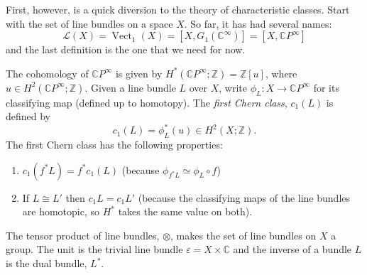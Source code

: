\documentclass[a4paper,10pt]{article}
\theoremstyle{plain}%
\theoremstyle{definition}
\theoremstyle{remark}
\newcommand{\ZZ}{\mathbb{Z}}
\newcommand{\CC}{\mathbb{C}}
\newcommand{\cp}{\CC P}   %
\newcommand{\CPi}{\cp^\infty}
\DeclareMathOperator{\Vect}{Vect}
\renewcommand{\epsilon}{\varepsilon}
\begin{document}
First, however, is a quick diversion to the theory of characteristic
classes. Start with the set of line bundles on a space $X$. So far, it
has had several names:
\begin{equation*}
  \mathcal{L}(X) = \Vect_1(X) = [X, G_1(\CC^\infty)] = [X, \CPi]
\end{equation*}
and the last definition is the one that we need for now.

The cohomology of $\CPi$ is given by $H^*(\CPi; \ZZ) = \ZZ[u]$, where
$u\in H^2(\CPi;\ZZ)$. Given a line bundle $L$ over $X$, write $\phi_L:
X\to \CPi$ for its classifying map (defined up to homotopy). The
\emph{first Chern class}, $c_1(L)$ is defined by
\begin{equation}\label{eq:first-chern-class}
  c_1(L) = \phi_L^*(u) \in H^2(X; \ZZ).
\end{equation}
The first Chern class has the following properties:
\begin{enumerate}
\item $c_1(f^*L) = f^*c_1(L)$ (because $\phi_{f^*L} \simeq \phi_L
  \circ f$)

\item If $L \cong L'$ then $c_1L = c_1L'$ (because the classifying
  maps of the line bundles are homotopic, so $H^*$ takes the same
  value on both).
\end{enumerate}
The tensor product of line bundles, $\otimes$, makes the set of line
bundles on $X$ a group. The unit is the trivial line bundle $\epsilon
= X\times \CC$ and the inverse of a bundle $L$ is the dual bundle,
$L^*$.
\end{document}

